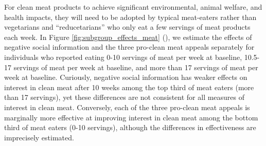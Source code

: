 \documentclass[12pt]{article}
\newcommand{\todo}[1]{\textit{\textcolor{red}{$<$todo$>$ #1 $<$/todo$>$}}}
\begin{document}
For clean meat products to achieve significant environmental, animal welfare, and health impacts, they will need to be adopted by typical meat-eaters rather than vegetarians and ``reducetarians'' who only eat a few servings of meat products each week. In Figure \ref{fig:subgroup_effects_meat} (), we estimate the effects of negative social information and the three pro-clean meat appeals separately for individuals who reported eating 0-10 servings of meat per week at baseline, 10.5-17 servings of meat per week at baseline, and more than 17 servings of meat per week at baseline. Curiously, negative social information has weaker effects on interest in clean meat after 10 weeks among the top third of meat eaters (more than 17 servings), yet these differences are not consistent for all measures of interest in clean meat. Conversely, each of the three pro-clean meat appeals is marginally more effective at improving interest in clean meat among the bottom third of meat eaters (0-10 servings), although the differences in effectiveness are imprecisely estimated.









\end{document}
